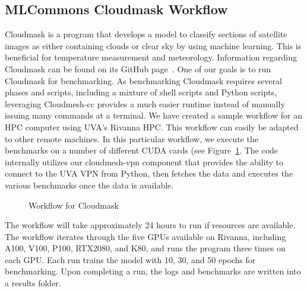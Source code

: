 
\subsection{MLCommons Cloudmask Workflow}
\label{cloudmask-workflow}

Cloudmask is a program that develops a model to classify sections of
satellite images as either containing clouds or clear sky by using
machine learning. This is beneficial for temperature measurement and
meteorology.  Information regarding Cloudmask can be found on its
GitHub page~\cite{www-cloudmask}.
One of our goals is to run Cloudmask for benchmarking.
As benchmarking Cloudmask requires
several phases and scripts, including a mixture of shell scripts and
Python scripts, leveraging Cloudmesh-cc provides a much easier runtime
instead of manually issuing many commands at a terminal.
We have created a sample workflow for an HPC
computer using UVA's Rivanna HPC. 
This workflow can easily be adapted to other remote machines. In this
particular workflow, we execute the benchmarks on a number of different
CUDA cards (see Figure~\ref{fig:cloudmaskwf}. The code internally utilizes
our cloudmesh-vpn component that provides the ability to
connect to the UVA VPN from Python, then fetches the data and executes
the various benchmarks once the data is available.


\begin{figure}[htb]
  \vspace{-1cm}
  \caption{Workflow for Cloudmask}\label{fig:cloudmaskwf}
\end{figure}


The workflow will take approximately 24 hours to run if resources are
available. The workflow iterates through the five GPUs available on
Rivanna, including A100, V100, P100, RTX2080, and K80, and runs the program
three times on each GPU. Each run trains the model with 10, 30, and 50
epochs for benchmarking.  Upon completing a run, the logs and
benchmarks are written into a results folder.

